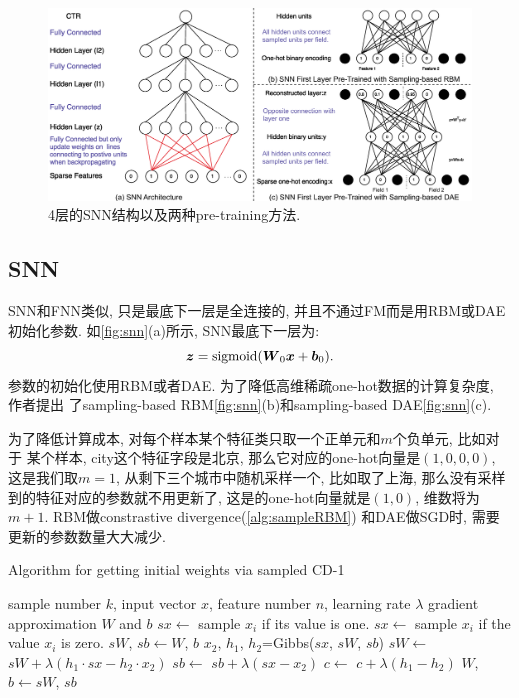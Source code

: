 \documentclass{ctexart}
\begin{document}
\begin{figure}[tb]
  \centering
  \includegraphics[width=1.1\columnwidth]{ssn3}
  \caption{4层的SNN结构以及两种pre-training方法.}\label{fig:snn}
\end{figure}
\subsection{SNN}
SNN和FNN类似, 只是最底下一层是全连接的, 并且不通过FM而是用RBM或DAE初始化参数.
如\autoref{fig:snn}(a)所示, SNN最底下一层为:
\begin{equation}
  \boldsymbol{z}=\operatorname*{sigmoid}(\boldsymbol{W}_{0}\boldsymbol{x}+\boldsymbol{b}_{0}).   \label{eq:defmodtwo}
\end{equation}
参数的初始化使用RBM或者DAE. 为了降低高维稀疏one-hot数据的计算复杂度, 作者提出
了sampling-based RBM\autoref{fig:snn}(b)和sampling-based DAE\autoref{fig:snn}(c).

为了降低计算成本, 对每个样本某个特征类只取一个正单元和\(m\)个负单元, 比如对于
某个样本, city这个特征字段是北京, 那么它对应的one-hot向量是\((1, 0, 0, 0)\),
这是我们取\(m=1\), 从剩下三个城市中随机采样一个, 比如取了上海, 那么没有采样
到的特征对应的参数就不用更新了, 这是的one-hot向量就是\((1, 0)\), 维数将为
\(m+1\). RBM做constrastive divergence(\autoref{alg:sampleRBM})
和DAE做SGD时, 需要更新的参数数量大大减少.

\begin{algorithm}[t]
  \caption{Algorithm for getting initial weights via sampled CD-1}
  \label{alg:sampleRBM}
  \begin{algorithmic}
  \renewcommand{\algorithmicrequire}{\textbf{Input:}}
  \renewcommand{\algorithmicensure}{\textbf{Output:}}
    \Require sample number $k$, input vector $x$, feature number $n$, learning rate $\lambda$
    \Ensure gradient approximation $W $ and $ b$
    \State 	   $ sx \leftarrow $ sample $x_{i}$ if its value is one.
              \State   $sx  \leftarrow $ sample $x_{i}$ if the value $x_{i}$ is zero.
         \EndFor
    \EndFor
    \State  $sW$, $sb \leftarrow W$, $b$
    \Statex{}
    \State $x_{2}$, $h_{1}$, $h_{2}$=Gibbs($sx$, $sW$, $sb$)
    \State  $ sW \leftarrow $  $sW+\lambda(h_{1}\cdot sx-h_{2}\cdot x_{2})   $
    \State $ sb \leftarrow $  $sb + \lambda(sx-x_{2})$
    \State $ c \leftarrow  $   $c +\lambda(h_{1}-h_{2})$
    \State $ W $, $b \leftarrow sW$, $sb$
	\Statex{}
  \end{algorithmic}
\end{algorithm}
\end{document}
